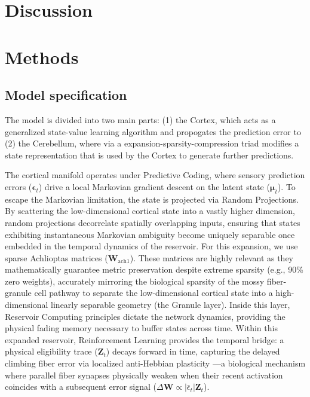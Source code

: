 \documentclass[12pt, a4paper]{extarticle}
\begin{document}
	\section{Discussion}
	
	\section{Methods}
	\label{sec:methods}

	\subsection{Model specification}
	The model is divided into two main parts: (1) the Cortex, which acts as a generalized state-value learning algorithm and propogates the prediction error to (2) the Cerebellum, where via a expansion-sparsity-compression triad modifies a state representation that is used by the Cortex to generate further predictions.
	
	The cortical manifold operates under Predictive Coding, where sensory prediction errors ($\boldsymbol{\epsilon}_t$) drive a local Markovian gradient descent on the latent state ($\boldsymbol{\mu}_t$). To escape the Markovian limitation, the state is projected via Random Projections. By scattering the low-dimensional cortical state into a vastly higher dimension, random projections decorrelate spatially overlapping inputs, ensuring that states exhibiting instantaneous Markovian ambiguity become uniquely separable once embedded in the temporal dynamics of the reservoir. For this expansion, we use sparse Achlioptas matrices \parencite{achlioptasDatabasefriendlyRandomProjections2003} ($\mathbf{W}_{\mathrm{ach1}}$). These matrices are highly relevant as they mathematically guarantee metric preservation despite extreme sparsity (e.g., 90\% zero weights), accurately mirroring the biological sparsity of the mossy fiber-granule cell pathway to separate the low-dimensional cortical state into a high-dimensional linearly separable geometry (the Granule layer). Inside this layer, Reservoir Computing principles dictate the network dynamics, providing the physical fading memory necessary to buffer states across time. Within this expanded reservoir, Reinforcement Learning \parencite{suttonReinforcementLearningIntroduction2018} provides the temporal bridge: a physical eligibility trace ($\mathbf{Z}_t$) decays forward in time, capturing the delayed climbing fiber error via localized anti-Hebbian plasticity \parencite{itoCerebellarLongtermDepression2001}---a biological mechanism where parallel fiber synapses physically weaken when their recent activation coincides with a subsequent error signal ($\Delta \mathbf{W} \propto |\bar{\epsilon}_t| \mathbf{Z}_t$). 
	
\end{document}
